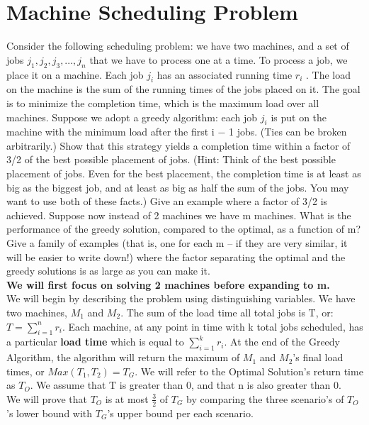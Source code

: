 \documentclass[11pt, solution, letterpaper]{format}
\begin{document}
\section{Machine Scheduling Problem}
Consider the following scheduling problem: we have two machines, and a set of jobs $j_1, j_2, j_3, . . . , j_n$ that we have to
process one at a time. To process a job, we place it on a machine. Each job $j_i$ has an associated running time $r_i$
. The
load on the machine is the sum of the running times of the jobs placed on it. The goal is to minimize the completion
time, which is the maximum load over all machines.
Suppose we adopt a greedy algorithm: each job $j_i$
is put on the machine with the minimum load after the first i − 1
jobs. (Ties can be broken arbitrarily.) Show that this strategy yields a completion time within a factor of 3/2 of the
best possible placement of jobs. (Hint: Think of the best possible placement of jobs. Even for the best placement, the
completion time is at least as big as the biggest job, and at least as big as half the sum of the jobs. You may want to
use both of these facts.) Give an example where a factor of 3/2 is achieved.
Suppose now instead of 2 machines we have m machines. What is the performance of the greedy solution, compared
to the optimal, as a function of m? Give a family of examples (that is, one for each m – if they are very similar, it
will be easier to write down!) where the factor separating the optimal and the greedy solutions is as large as you can
make it.\\

\textbf{We will first focus on solving 2 machines before expanding to m.}\\

We will begin by describing the problem using distinguishing variables. We have two machines, $M_1$ and $M_2$. The sum of the load time all total jobs is T, or: $T = \sum_{i=1}^{n} r_i $.  Each machine, at any point in time with k total jobs scheduled, has a particular \textbf{load time} which is equal to $\sum_{i=1}^{k} r_i $. At the end of the Greedy Algorithm, the algorithm will return the maximum of $M_1$ and $M_2$'s final load times, or $Max(T_1, T_2) = T_G$. We will refer to the Optimal Solution's return time as $T_O$. We assume that T is greater than 0, and that n is also greater than 0.\\

We will prove that $T_O$ is at most $\frac{3}{2}$ of $T_G$ by comparing the three scenario's of $T_O$'s lower bound with $T_G$'s upper bound per each scenario. \\
\end{document}
